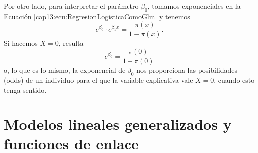 Por otro lado, para interpretar el parámetro $\beta_0$, tomamos exponenciales en
la Ecuación     \ref{cap13:ecu:RegresionLogisticaComoGlm} y tenemos
	\[e^{\beta_0}\cdot e^{\beta_1 x}=\dfrac{\pi(x)}{1-\pi(x)}.\]
Si hacemos $X=0$, resulta
	\[e^{\beta_0}=\dfrac{\pi(0)}{1-\pi(0)}\]
o, lo que es lo mismo, la exponencial de $\beta_0$ nos proporciona las  posibilidades (odds)
de un individuo para el que la variable explicativa vale $X=0$, cuando esto tenga sentido.
%
%
%
%   	

\section{Modelos lineales generalizados y funciones de enlace}
\label{cap13:sec:FuncionesEnlace}

